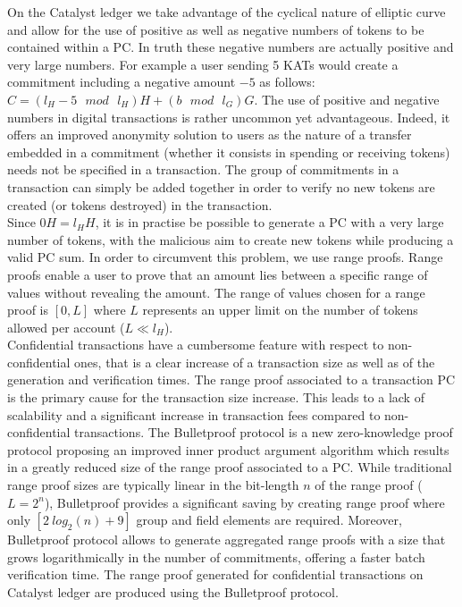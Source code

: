 On the Catalyst ledger we take advantage of the cyclical nature of elliptic curve and allow for the use of positive as well as negative numbers of tokens to be contained within a PC. In truth these negative numbers are actually positive and very large numbers. For example a user sending 5 KATs would create a commitment including a negative amount $-5$ as follows: $C = (l_H - 5 \text{ $mod$ } l_H) H + (b \text{ $mod$ } l_G) G$. The use of positive and negative numbers in digital transactions is rather uncommon yet advantageous. Indeed, it offers an improved anonymity solution to users as the nature of a transfer embedded in a commitment (whether it consists in spending or receiving tokens) needs not be specified in a transaction. The group of commitments in a transaction can simply be added together in order to verify no new tokens are created (or tokens destroyed) in the transaction. \\

Since $0H=l_HH$, it is in practise be possible to generate a PC with a very large number of tokens, with the malicious aim to create new tokens while producing a valid PC sum. In order to circumvent this problem, we use range proofs. Range proofs enable a user to prove that an amount lies between a specific range of values without revealing the amount. The range of values chosen for a range proof is $[0,L]$ where $L$ represents an upper limit on the number of tokens allowed per account ($L \ll l_H$).\\

Confidential transactions have a cumbersome feature with respect to non-confidential ones, that is a clear increase of a transaction size as well as of the generation and verification times. The range proof associated to a transaction PC is the primary cause for the transaction size increase. This leads to a lack of scalability and a significant increase in transaction fees compared to non-confidential transactions. The Bulletproof protocol is a new zero-knowledge proof protocol \cite{bulletproof} proposing an improved inner product argument algorithm which results in a greatly reduced size of the range proof associated to a PC. While traditional range proof sizes are typically linear in the bit-length $n$ of the range proof ($L = 2^n$), Bulletproof provides a significant saving by creating range proof where only $[2~log_2(n) + 9]$ group and field elements are required. Moreover, Bulletproof protocol allows to generate aggregated range proofs with a size that grows logarithmically in the number of commitments, offering a faster batch verification time. The range proof generated for confidential transactions on Catalyst ledger are produced using the Bulletproof protocol. 
